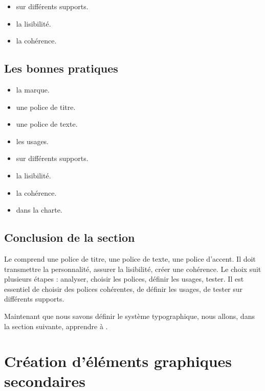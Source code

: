\begin{itemize}
    \item {} sur différents supports.
    \item {} la lisibilité.
    \item {} la cohérence.
\end{itemize}

\subsection{Les bonnes pratiques}

\begin{itemize}
    \item {} la marque.
    \item {} une police de titre.
    \item {} une police de texte.
    \item {} les usages.
    \item {} sur différents supports.
    \item {} la lisibilité.
    \item {} la cohérence.
    \item {} dans la charte.
\end{itemize}

\subsection*{Conclusion de la section}

Le  comprend une police de titre, une police de texte, une police d'accent. Il doit transmettre la personnalité, assurer la lisibilité, créer une cohérence. Le choix suit plusieurs étapes : analyser, choisir les polices, définir les usages, tester. Il est essentiel de choisir des polices cohérentes, de définir les usages, de tester sur différents supports.

Maintenant que nous savons définir le système typographique, nous allons, dans la section suivante, apprendre à .

\section{Création d'éléments graphiques secondaires}

